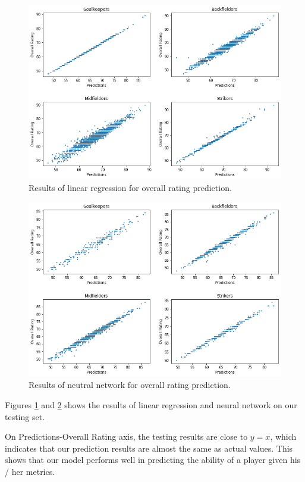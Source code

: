 \documentclass{article}
\begin{document}
\begin{figure}[!htb]
	\centering
    \includegraphics[scale=0.45]{linear.png}
    \caption{Results of linear regression for overall rating prediction.}\label{fig3}
\end{figure}

\begin{figure}[!htb]
	\centering
    \includegraphics[scale=0.45]{nn.png}
    \caption{Results of neutral network for overall rating prediction.}\label{fig4}
\end{figure}

Figures \ref{fig3} and \ref{fig4} shows the results of linear regression and neural network on our testing set.

On Predictions-Overall Rating axis, the testing results are close to $y=x$, which indicates that our prediction results are almost the same as actual values. This shows that our model performs well in predicting the ability of a player given his / her metrics. 
\end{document}
